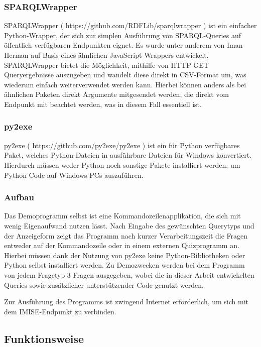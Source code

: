 \documentclass[headsepline,titlepage,ngerman,twoside,12pt]{report}
\begin{document}
\subsubsection{SPARQLWrapper}

SPARQLWrapper ( https://github.com/RDFLib/sparqlwrapper ) ist ein einfacher Python-Wrapper, der sich zur simplen Ausführung von SPARQL-Queries auf öffentlich verfügbaren Endpunkten eignet.
Es wurde unter anderem von Iman Herman auf Basis eines ähnlichen JavaScript-Wrappers entwickelt.
SPARQLWrapper bietet die Möglichkeit, mithilfe von HTTP-GET Queryergebnisse auszugeben und wandelt diese direkt in CSV-Format um, was wiederum einfach weiterverwendet werden kann.
Hierbei können anders als bei ähnlichen Paketen direkt Argumente mitgesendet werden, die direkt vom Endpunkt mit beachtet werden, was in diesem Fall essentiell ist.

\subsubsection{py2exe}

py2exe ( https://github.com/py2exe/py2exe ) ist ein für Python verfügbares Paket, welches Python-Dateien in ausführbare Dateien für Windows konvertiert.
Hierdurch müssen weder Python noch sonstige Pakete installiert werden, um Python-Code auf Windows-PCs auszuführen.

\subsubsection{Aufbau}

Das Demoprogramm selbst ist eine Kommandozeilenapplikation, die sich mit wenig Eigenaufwand nutzen lässt.
Nach Eingabe des gewünschten Querytyps und der Anzeigeform zeigt das Programm nach kurzer Verarbeitungszeit die Fragen entweder auf der Kommandozeile oder in einem externen Quizprogramm an.
Hierbei müssen dank der Nutzung von py2exe keine Python-Bibliotheken oder Python selbst installiert werden.
Zu Demozwecken werden bei dem Programm von jedem Fragetyp 3 Fragen ausgegeben, wobei die in dieser Arbeit entwickelten Queries sowie zusätzlicher unterstützender Code genutzt werden.

Zur Ausführung des Programms ist zwingend Internet erforderlich, um sich mit dem IMISE-Endpunkt zu verbinden.

\subsection{Funktionsweise}
\end{document}
